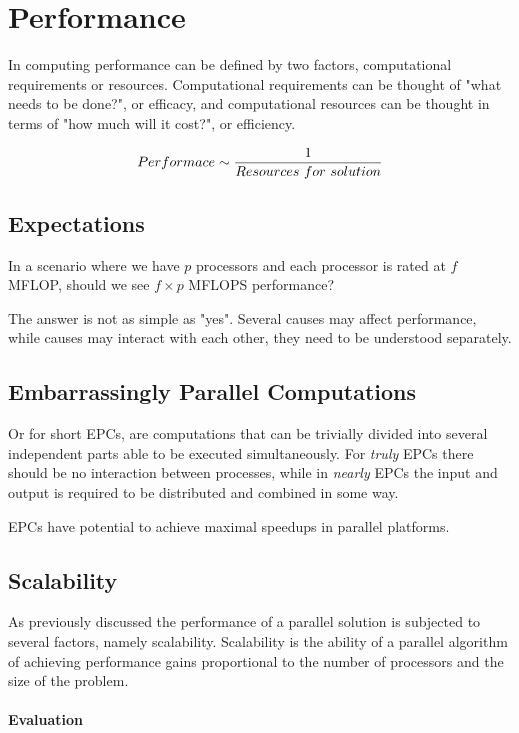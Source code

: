 
\section{Performance}

In computing performance can be defined by two factors,
computational requirements or resources.
Computational requirements can be thought of "what needs to be done?", or efficacy,
and computational resources can be thought in terms of "how much will it cost?", or efficiency.

\begin{equation}
    \mathnormal{Performace} \sim \frac{1}{\mathnormal{Resources~for~solution}}
\end{equation}

\subsection{Expectations}

In a scenario where we have $p$ processors and each processor is rated at $f$ MFLOP, should we see $f \times p$ MFLOPS performance?

The answer is not as simple as "yes".
Several causes may affect performance, while causes may interact with each other,
they need to be understood separately.

\subsection{Embarrassingly Parallel Computations}

Or for short EPCs, are computations that can be trivially divided into several independent parts able to be executed simultaneously.
For \textit{truly} EPCs there should be no interaction between processes, while in \textit{nearly} EPCs the input and output is required to be distributed and combined in some way.

EPCs have potential to achieve maximal speedups in parallel platforms.


\subsection{Scalability}
As previously discussed the performance of a parallel solution is subjected to several factors, namely scalability.
Scalability is the ability of a parallel algorithm of achieving performance gains proportional to the number of processors and the size of the problem.

\paragraph{Evaluation}

